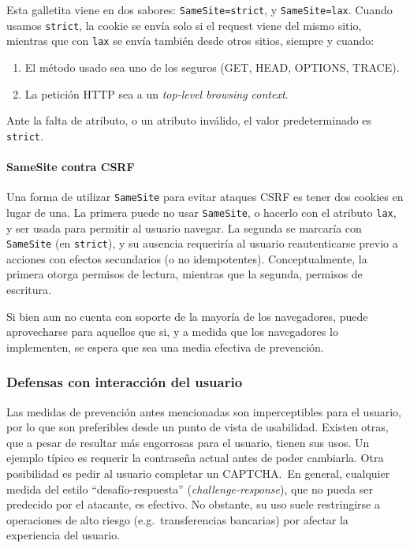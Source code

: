 \documentclass{article}
\theoremstyle{definition}
\begin{document}
Esta galletita viene en dos sabores: \verb+SameSite=strict+, y
\verb+SameSite=lax+. Cuando usamos \verb+strict+, la cookie se envía solo si el request viene del
mismo sitio, mientras que con \verb+lax+ se envía también desde otros sitios,
siempre y cuando:
\begin{enumerate}
  \item El método usado sea uno de los seguros (GET, HEAD, OPTIONS, TRACE).
  \item La petición HTTP sea a un \textit{top-level browsing context}.
\end{enumerate}
Ante la falta de atributo, o un atributo inválido, el valor predeterminado es
\verb+strict+.

\paragraph{SameSite contra CSRF} Una forma de utilizar \verb+SameSite+ para
evitar ataques CSRF es tener dos cookies en lugar de una. La primera puede no
usar \verb+SameSite+, o hacerlo con el atributo \verb+lax+, y ser usada para
permitir al usuario navegar. La segunda se marcaría con \verb+SameSite+ (en
\verb+strict+), y su ausencia requeriría al usuario reautenticarse previo a
acciones con efectos secundarios (o no idempotentes). Conceptualmente, la
primera otorga permisos de lectura, mientras que la segunda, permisos de
escritura.

Si bien aun no cuenta con soporte de la mayoría de los navegadores, puede
aprovecharse para aquellos que si, y a medida que los navegadores lo
implementen, se espera que sea una media efectiva de prevención.

\subsubsection{Defensas con interacción del usuario}
Las medidas de prevención antes mencionadas son imperceptibles para el usuario,
por lo que son preferibles desde un punto de vista de usabilidad. Existen otras,
que a pesar de resultar más engorrosas para el usuario, tienen sus usos. Un
ejemplo típico es requerir la contraseña actual antes de poder cambiarla. Otra
posibilidad es pedir al usuario completar un CAPTCHA.\ En general, cualquier
medida del estilo ``desafío-respuesta'' (\textit{challenge-response}), que no
pueda ser predecido por el atacante, es efectivo. No obstante, su uso suele
restringirse a operaciones de alto riesgo (e.g.\ transferencias bancarias) por afectar la
experiencia del usuario.
\end{document}
